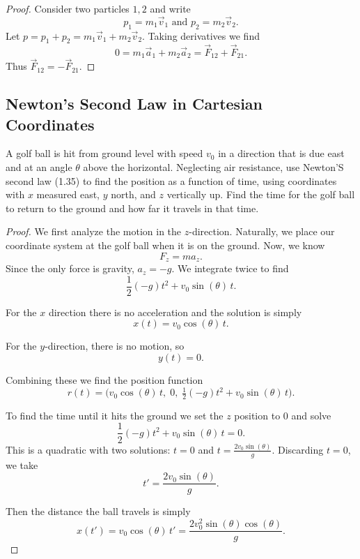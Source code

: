 \begin{proof}
    Consider two particles $1,2$ and write 
    \[p_1 = m_1 \vec{v}_1 \text{ and } p_2 = m_2 \vec{v}_2.\]
    Let $p = p_1 + p_2 = m_1 \vec{v}_1 + m_2 \vec{v}_2$.
    Taking derivatives we find 
    \[0 = m_1 \vec{a}_1 + m_2 \vec{a}_2 = \vec{F}_{12} + \vec{F}_{21}.\]
    Thus $\vec{F}_{12} = -\vec{F}_{21}$.
\end{proof}

\subsection{Newton's Second Law in Cartesian Coordinates}


\begin{tcolorbox}[title=Problem 35, breakable]
    A golf ball is hit from ground level with speed $v_0$
    in a direction that is due east and at an angle $\theta$
    above the horizontal. Neglecting air resistance, use Newton'S
    second law (1.35) to find the position as a function of time,
    using coordinates with $x$ measured east, $y$ north, and $z$ vertically up.
    Find the time for the golf ball to return to the ground and how far it travels in that time.
\end{tcolorbox}

\begin{proof}
    We first analyze the motion in the $z$-direction.
    Naturally, we place our coordinate system at the golf ball 
    when it is on the ground.
    Now, we know 
    \[F_z = m a_z.\]
    Since the only force is gravity, $a_z = -g$.
    We integrate twice to find 
    \[\frac{1}{2}(-g)t^2 + v_0 \sin(\theta)\, t.\]

    For the $x$ direction there is no acceleration and the  
    solution is simply 
    \[x(t) = v_0 \cos(\theta)\, t.\]

    For the $y$-direction, there is no motion, so 
    \[y(t) = 0.\]

    Combining these we find the position function 
    \[r(t) = \bigl(v_0 \cos(\theta)\, t,\; 0,\; \tfrac{1}{2}(-g)t^2 + v_0 \sin(\theta)\, t\bigr).\]

    To find the time until it hits the ground we set the $z$ position to $0$ and solve 
    \[\frac{1}{2}(-g)t^2 + v_0 \sin(\theta)\, t = 0.\]
    This is a quadratic with two solutions:
    $t = 0$ and $t = \frac{2 v_0 \sin(\theta)}{g}$.
    Discarding $t = 0$, we take 
    \[t' = \frac{2 v_0 \sin(\theta)}{g}.\]

    Then the distance the ball travels is simply 
    \[x(t') = v_0 \cos(\theta)\, t' = \frac{2 v_0^2 \sin(\theta)\cos(\theta)}{g}.\]
\end{proof}


